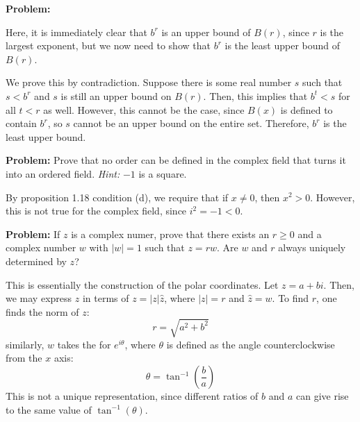 \documentclass[10pt]{article}
\newenvironment{problem}{\textbf{Problem:}}{}
\begin{document}
\begin{problem}
\begin{enumerate}[label=\alph*)]
				\begin{solution}
					Here, it is immediately clear that \( b^{r} \) is an upper bound of \( B(r) \), since \( r \) is 
					the largest exponent, but we now need to show that \( b^{r} \) is the least upper bound of 
					\( B(r) \).

					We prove this by contradiction. Suppose there is some real number \( s \) such that 
					\( s < b^{r} \) and \( s \) is still an upper bound on \( B(r) \). Then, this implies that 
					\( b^{t} < s \) for all \( t < r \) as well. However, this cannot be the case, since 
					\( B(x) \) is defined to contain \( b^{r} \), so \( s \) cannot be an upper 
					bound on the entire set. Therefore, \( b^{r} \) is the least upper bound.  
				\end{solution}
		\end{enumerate}
	\end{problem}

	\begin{problem}
		Prove that no order can be defined in the complex field that turns it into an ordered field. \textit{Hint:}
		\( -1 \) is a square. 
	\end{problem}

	\begin{solution}
		By proposition 1.18 condition (d), we require that if \( x \neq 0 \), then \( x^2 > 0 \). However, 
		this is not true for the complex field, since \( i^2 = -1 < 0 \).  
	\end{solution}

	\begin{problem}
		If \( z \) is a complex numer, prove that there exists an \( r \ge  0 \) and a complex 
		number \( w \) with \( |w| = 1 \) such that \( z = rw \). Are \( w \) and \( r \) always uniquely 
		determined by \( z \)? 
	\end{problem}

	\begin{solution}
		This is essentially the construction of the polar coordinates. Let \( z = a + bi \). Then, we 
		may express \( z \) in terms of \( z = |z| \hat{z} \), where \( |z| = r\)  and \( \hat{z} = w \). 
		To find \( r \), one finds the norm of \( z \):
		\[
		r = \sqrt{a^2 + b^2} 
		\] 
		similarly, \( w \) takes the for \( e^{i \theta} \), where \( \theta \) is defined as the angle 
		counterclockwise from the \( x \) axis:
		\[
		\theta = \tan^{-1}\left( \frac{b}{a} \right) 
		\] 
		This is not a unique representation, since different ratios of \( b  \) and \( a \) can give rise 
		to the same value of \( \tan^{-1}(\theta) \). 
	\end{solution}
\end{document}
